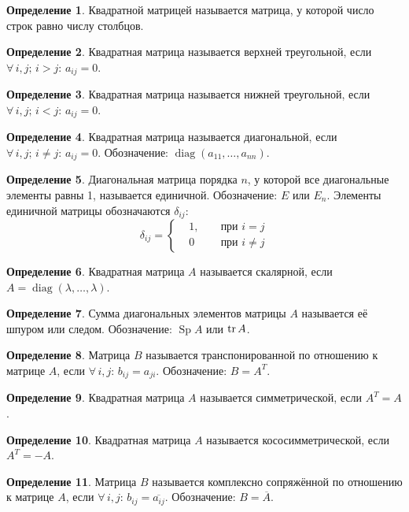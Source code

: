 \documentclass[12pt]{article}
\theoremstyle{definition}
\newtheorem{definition}{Определение}
\DeclareMathOperator{\diag}{diag}
\DeclareMathOperator{\spur}{Sp}
\begin{document}
\begin{definition}
    Квадратной матрицей называется матрица, у которой число строк равно числу столбцов.
\end{definition}
\begin{definition}
    Квадратная матрица называется верхней треугольной, если $\forall\,i,j;\,i>j:\,a_{ij}=0$.
\end{definition}
\begin{definition}
    Квадратная матрица называется нижней треугольной, если $\forall\,i,j;\,i<j:\,a_{ij}=0$.
\end{definition}
\begin{definition}
    Квадратная матрица называется диагональной, если $\forall\,i,j;\,i\neq j:\,a_{ij}=0$. Обозначение: $\diag(a_{11},\ldots,a_{nn})$.
\end{definition}
\begin{definition}
    Диагональная матрица порядка $n$, у которой все диагональные элементы равны 1, называется единичной. Обозначение: $E$ или $E_n$. Элементы единичной матрицы обозначаются $\delta_{ij}$:
    $$\delta_{ij}=\left\{\begin{alignedat}{2}
        & 1, && \text{ при }i=j \\
        & 0  && \text{ при }i\neq j
      \end{alignedat}\right.$$
\end{definition}
\begin{definition}
    Квадратная матрица $A$ называется скалярной, если $A=\diag(\lambda,\ldots,\lambda)$.
\end{definition}
\begin{definition}
    Сумма диагональных элементов матрицы $A$ называется её шпуром или следом. Обозначение: $\spur A$ или $\tr A$.
\end{definition}
\begin{definition}
    Матрица $B$ называется транспонированной по отношению к матрице $A$, если $\forall\,i,j:\,b_{ij}=a_{ji}$. Обозначение: $B=A^T$.
\end{definition}
\begin{definition}
    Квадратная матрица $A$ называется симметрической, если $A^T=A$.
\end{definition}
\begin{definition}
    Квадратная матрица $A$ называется кососимметрической, если $A^T=-A$.
\end{definition}
\begin{definition}
    Матрица $B$ называется комплексно сопряжённой по отношению к матрице $A$, если $\forall\,i,j:\,b_{ij}=\overline{a_{ij}}$. Обозначение: $B=\overline{A}$.
\end{definition}
\end{document}
